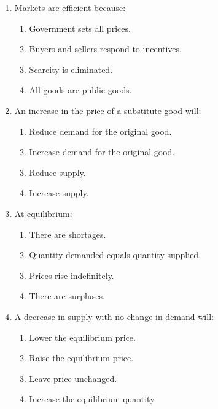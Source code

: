 \documentclass[12pt]{article}
\begin{document}
\begin{enumerate}[label=\textbf{\arabic*.}]
\item Markets are efficient because:
\begin{enumerate}[label=(\Alph*)]
    \item Government sets all prices.
    \item Buyers and sellers respond to incentives.
    \item Scarcity is eliminated.
    \item All goods are public goods.
\end{enumerate}

\item An increase in the price of a substitute good will:
\begin{enumerate}[label=(\Alph*)]
    \item Reduce demand for the original good.
    \item Increase demand for the original good.
    \item Reduce supply.
    \item Increase supply.
\end{enumerate}

\item At equilibrium:
\begin{enumerate}[label=(\Alph*)]
    \item There are shortages.
    \item Quantity demanded equals quantity supplied.
    \item Prices rise indefinitely.
    \item There are surpluses.
\end{enumerate}

\item A decrease in supply with no change in demand will:
\begin{enumerate}[label=(\Alph*)]
    \item Lower the equilibrium price.
    \item Raise the equilibrium price.
    \item Leave price unchanged.
    \item Increase the equilibrium quantity.
\end{enumerate}


\end{enumerate}
\end{document}
